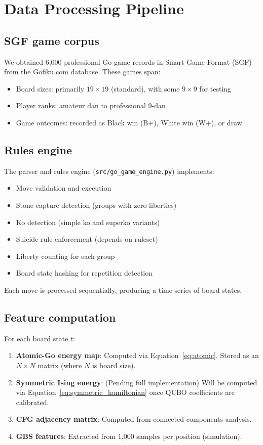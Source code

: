 \documentclass[aps,prl,reprint]{revtex4-2}
\begin{document}
\section{Data Processing Pipeline}

\subsection{SGF game corpus}

We obtained 6,000 professional Go game records in Smart Game Format (SGF) from the Gofiku.com database. These games span:
\begin{itemize}
	\item Board sizes: primarily $19 \times 19$ (standard), with some $9 \times 9$ for testing
	\item Player ranks: amateur dan to professional 9-dan
	\item Game outcomes: recorded as Black win (B+), White win (W+), or draw
\end{itemize}

\subsection{Rules engine}

The parser and rules engine (\texttt{src/go\_game\_engine.py}) implements:
\begin{itemize}
	\item Move validation and execution
	\item Stone capture detection (groups with zero liberties)
	\item Ko detection (simple ko and superko variants)
	\item Suicide rule enforcement (depends on ruleset)
	\item Liberty counting for each group
	\item Board state hashing for repetition detection
\end{itemize}

Each move is processed sequentially, producing a time series of board states.

\subsection{Feature computation}

For each board state $t$:
\begin{enumerate}
	\item \textbf{Atomic-Go energy map}: Computed via Equation~\eqref{eq:atomic}. Stored as an $N \times N$ matrix (where $N$ is board size).
	\item \textbf{Symmetric Ising energy}: (Pending full implementation) Will be computed via Equation~\eqref{eq:symmetric_hamiltonian} once QUBO coefficients are calibrated.
	\item \textbf{CFG adjacency matrix}: Computed from connected components analysis.
	\item \textbf{GBS features}: Extracted from 1,000 samples per position (simulation).
\end{enumerate}
\end{document}
